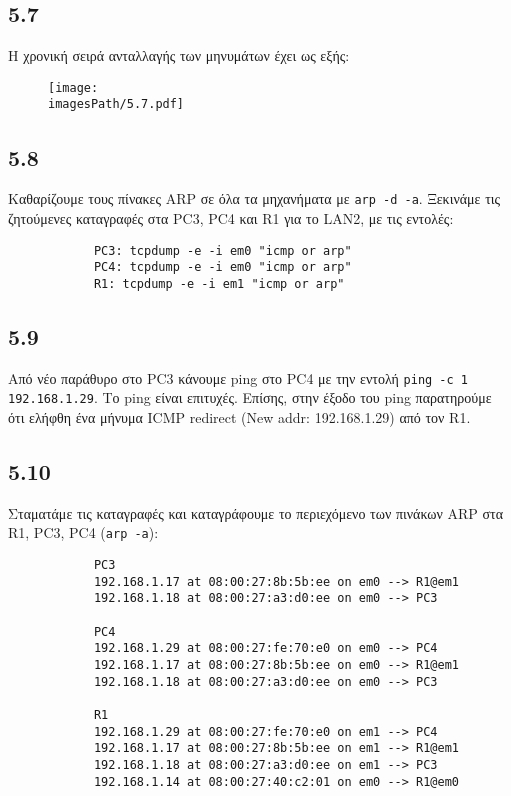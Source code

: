 \documentclass[a4paper, 12pt]{article}
\newcommand{\imagesPath}{.}
\begin{document}
	\subsection*{5.7}
		Η χρονική σειρά ανταλλαγής των μηνυμάτων έχει ως εξής:
		
		\begin{figure}[H]
			\texttt{[image: \\imagesPath/5.7.pdf]}
		\end{figure}

	\subsection*{5.8}
		Καθαρίζουμε τους πίνακες ARP σε όλα τα μηχανήματα με \verb|arp -d -a|. Ξεκινάμε τις ζητούμενες καταγραφές στα PC3, PC4 και R1 για το LAN2, με τις εντολές:
		
		\begin{verbatim}
			PC3: tcpdump -e -i em0 "icmp or arp"
			PC4: tcpdump -e -i em0 "icmp or arp"
			R1: tcpdump -e -i em1 "icmp or arp"
		\end{verbatim}

	\subsection*{5.9}
		Από νέο παράθυρο στο PC3 κάνουμε ping στο PC4 με την εντολή \verb|ping -c 1 192.168.1.29|. Το ping είναι επιτυχές. Επίσης, στην έξοδο του ping παρατηρούμε ότι ελήφθη ένα μήνυμα ICMP redirect (New addr: 192.168.1.29) από τον R1.

	\subsection*{5.10}
		Σταματάμε τις καταγραφές και καταγράφουμε το περιεχόμενο των πινάκων ARP στα R1, PC3, PC4 (\verb|arp -a|):
		
		\begin{verbatim}
			PC3
			192.168.1.17 at 08:00:27:8b:5b:ee on em0 --> R1@em1
			192.168.1.18 at 08:00:27:a3:d0:ee on em0 --> PC3
			
			PC4
			192.168.1.29 at 08:00:27:fe:70:e0 on em0 --> PC4
			192.168.1.17 at 08:00:27:8b:5b:ee on em0 --> R1@em1
			192.168.1.18 at 08:00:27:a3:d0:ee on em0 --> PC3
			
			R1
			192.168.1.29 at 08:00:27:fe:70:e0 on em1 --> PC4
			192.168.1.17 at 08:00:27:8b:5b:ee on em1 --> R1@em1
			192.168.1.18 at 08:00:27:a3:d0:ee on em1 --> PC3
			192.168.1.14 at 08:00:27:40:c2:01 on em0 --> R1@em0
		\end{verbatim}
\end{document}
